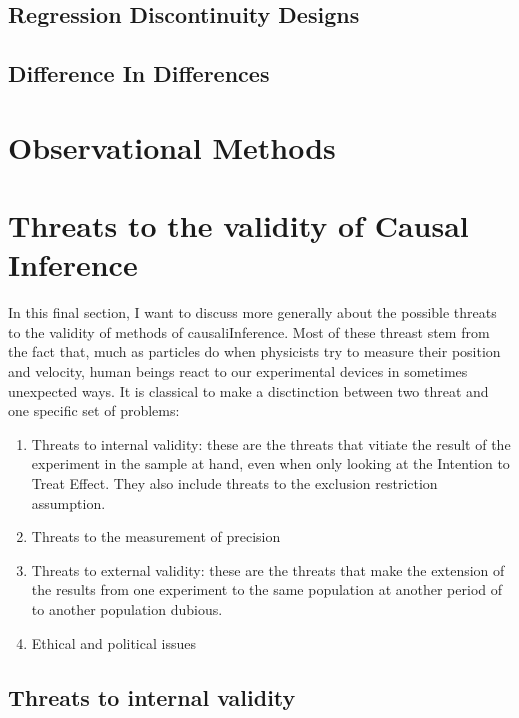 \documentclass[
]{book}
\providecommand{\tightlist}{%
  \setlength{\itemsep}{0pt}\setlength{\parskip}{0pt}}
\theoremstyle{definition}
\theoremstyle{definition}
\theoremstyle{definition}
\theoremstyle{definition}
\theoremstyle{remark}
\begin{document}
\hypertarget{regression-discontinuity-designs}{%
\section{Regression Discontinuity Designs}\label{regression-discontinuity-designs}}

\hypertarget{difference-in-differences}{%
\section{Difference In Differences}\label{difference-in-differences}}

\hypertarget{sec:OM}{%
\chapter{Observational Methods}\label{sec:OM}}

\hypertarget{sec:threats}{%
\chapter{Threats to the validity of Causal Inference}\label{sec:threats}}

In this final section, I want to discuss more generally about the possible threats to the validity of methods of causaliInference.
Most of these threast stem from the fact that, much as particles do when physicists try to measure their position and velocity, human beings react to our experimental devices in sometimes unexpected ways.
It is classical to make a disctinction between two threat and one specific set of problems:

\begin{enumerate}
\def\labelenumi{\arabic{enumi}.}
\tightlist
\item
  Threats to internal validity: these are the threats that vitiate the result of the experiment in the sample at hand, even when only looking at the Intention to Treat Effect.
  They also include threats to the exclusion restriction assumption.
\item
  Threats to the measurement of precision
\item
  Threats to external validity: these are the threats that make the extension of the results from one experiment to the same population at another period of to another population dubious.
\item
  Ethical and political issues
\end{enumerate}

\hypertarget{threats-to-internal-validity}{%
\section{Threats to internal validity}\label{threats-to-internal-validity}}
\end{document}
